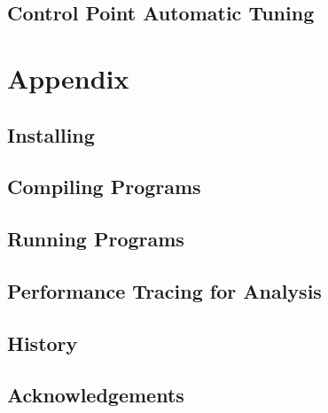 \documentclass[10pt]{report}
\begin{document}
\chapter{Control Point Automatic Tuning}
\label{sec:controlpoint}
  


\part{Appendix}
\appendix

%

\chapter{Installing \charm}
\label{sec:install}
  

\chapter{Compiling \charm Programs}
\label{sec:compile}
  

\chapter{Running \charm Programs}
\label{sec:run}
  

\chapter{Performance Tracing for Analysis}
\label{sec:trace-projections}
  


\chapter{History}
  

\chapter {Acknowledgements}
  


\end{document}
